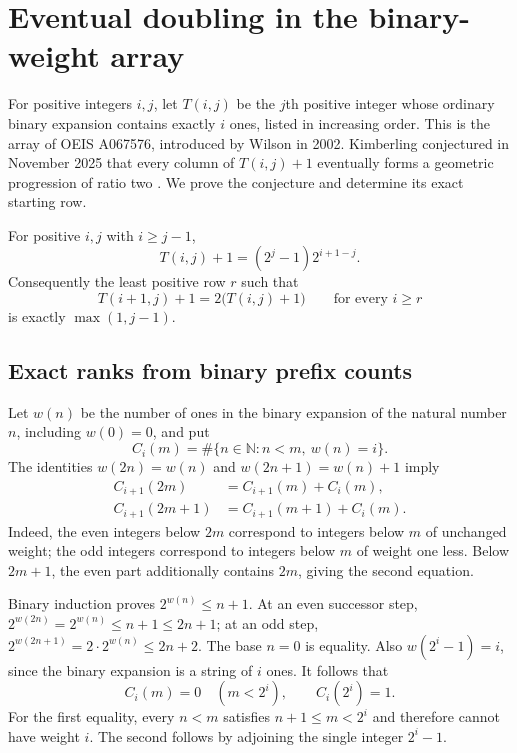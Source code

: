 \section{Eventual doubling in the binary-weight array}

For positive integers $i,j$, let $T(i,j)$ be the $j$th positive integer
whose ordinary binary expansion contains exactly $i$ ones, listed in
increasing order. This is the array of OEIS A067576, introduced by
Wilson in 2002. Kimberling conjectured in November 2025 that every
column of $T(i,j)+1$ eventually forms a geometric progression of ratio
two \cite{oeis067576}. We prove the conjecture and determine its exact
starting row.

\begin{theorem}\label{a067576:main}
For positive $i,j$ with $i\ge j-1$,
\begin{equation}\label{a067576:formula}
 T(i,j)+1=(2^j-1)2^{i+1-j}.
\end{equation}
Consequently the least positive row $r$ such that
\[
 T(i+1,j)+1=2\bigl(T(i,j)+1\bigr)\qquad\text{for every }i\ge r
\]
is exactly $\max(1,j-1)$.
\end{theorem}

\subsection*{Exact ranks from binary prefix counts}
Let $w(n)$ be the number of ones in the binary expansion of the natural
number $n$, including $w(0)=0$, and put
\[
 C_i(m)=\#\{n\in\mathbb N: n<m,\ w(n)=i\}.
\]
The identities $w(2n)=w(n)$ and $w(2n+1)=w(n)+1$ imply
\begin{align}
 C_{i+1}(2m)&=C_{i+1}(m)+C_i(m),\label{a067576:even}\\
 C_{i+1}(2m+1)&=C_{i+1}(m+1)+C_i(m).\label{a067576:odd}
\end{align}
Indeed, the even integers below $2m$ correspond to integers below $m$
of unchanged weight; the odd integers correspond to integers below $m$
of weight one less. Below $2m+1$, the even part additionally contains
$2m$, giving the second equation.

Binary induction proves $2^{w(n)}\le n+1$. At an even successor step,
$2^{w(2n)}=2^{w(n)}\le n+1\le2n+1$; at an odd step,
$2^{w(2n+1)}=2\cdot2^{w(n)}\le2n+2$. The base $n=0$ is equality.
Also $w(2^i-1)=i$, since the binary expansion is a string of $i$ ones.
It follows that
\begin{equation}\label{a067576:minimum}
 C_i(m)=0\quad(m<2^i),\qquad C_i(2^i)=1.
\end{equation}
For the first equality, every $n<m$ satisfies $n+1\le m<2^i$ and
therefore cannot have weight $i$. The second follows by adjoining the
single integer $2^i-1$.

